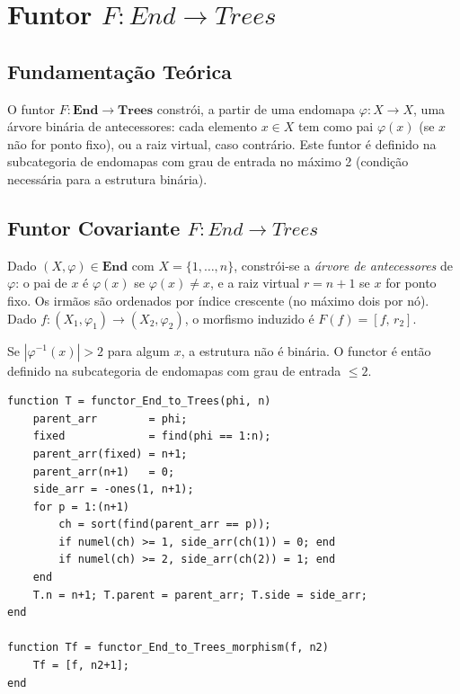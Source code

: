 \section{Funtor \texorpdfstring{$F: End \to Trees$}{F: End -> Trees}}
\label{sec:functor-end-trees}

\subsection{Fundamentação Teórica}

O funtor $F: \mathbf{End} \to \mathbf{Trees}$ constrói, a partir de uma endomapa $\varphi: X \to X$, uma árvore binária de antecessores: cada elemento $x \in X$ tem como pai $\varphi(x)$ (se $x$ não for ponto fixo), ou a raiz virtual, caso contrário. Este funtor é definido na subcategoria de endomapas com grau de entrada no máximo 2 (condição necessária para a estrutura binária).

\subsection{Funtor Covariante \texorpdfstring{$F: End \to Trees$}{F: End -> Trees}}

\begin{definition}
Dado $(X, \varphi) \in \mathbf{End}$ com $X = \{1,\ldots,n\}$, constrói-se a \emph{árvore de antecessores} de $\varphi$: o pai de $x$ é $\varphi(x)$ se $\varphi(x) \neq x$, e a raiz virtual $r = n{+}1$ se $x$ for ponto fixo. Os irmãos são ordenados por índice crescente (no máximo dois por nó). Dado $f: (X_1, \varphi_1) \to (X_2, \varphi_2)$, o morfismo induzido é $F(f) = [f,\,r_2]$.
\end{definition}

\begin{remark}
Se $|\varphi^{-1}(x)| > 2$ para algum $x$, a estrutura não é binária. O functor é então definido na subcategoria de endomapas com grau de entrada $\leq 2$.
\end{remark}

\begin{lstlisting}[style=matlab, caption={Funtor covariante $F: \mathbf{End} \to \mathbf{Trees}$}]
function T = functor_End_to_Trees(phi, n)
    parent_arr        = phi;
    fixed             = find(phi == 1:n);
    parent_arr(fixed) = n+1;
    parent_arr(n+1)   = 0;
    side_arr = -ones(1, n+1);
    for p = 1:(n+1)
        ch = sort(find(parent_arr == p));
        if numel(ch) >= 1, side_arr(ch(1)) = 0; end
        if numel(ch) >= 2, side_arr(ch(2)) = 1; end
    end
    T.n = n+1; T.parent = parent_arr; T.side = side_arr;
end

function Tf = functor_End_to_Trees_morphism(f, n2)
    Tf = [f, n2+1];
end
\end{lstlisting}

